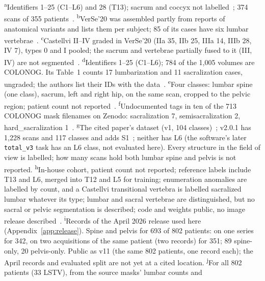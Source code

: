 \begin{table}[h]
\smallskip
\footnotesize
\raggedright
\textsuperscript{a}Identifiers 1--25 (C1--L6) and 28 (T13); sacrum and coccyx not
labelled~\citep{VerSeRepo}; 374 scans of 355 patients~\citep{Sekuboyina2021VerSe:Images}.
\textsuperscript{b}VerSe'20 was assembled partly from reports of anatomical variants and
lists them per subject; 85 of its cases have six lumbar vertebrae~\citep{Liebl2021VerSeData}.
\textsuperscript{c}Castellvi II--IV graded in VerSe'20 (IIa 35, IIb 25, IIIa 14, IIIb 28,
IV 7), types 0 and I pooled; the sacrum and vertebrae partially fused to it (III, IV) are
not segmented~\citep{Liebl2021VerSeData}.
\textsuperscript{d}Identifiers 1--25 (C1--L6); 784 of the 1{,}005 volumes are COLONOG.
Its Table~1 counts 17 lumbarization and 11 sacralization cases, ungraded; the authors list
their IDs with the data~\citep{Deng2021CTSpine1K:Tomography}.
\textsuperscript{e}Four classes: lumbar spine (one class), sacrum, left and right hip, on
the same scan, cropped to the pelvic region; patient count not
reported~\citep{Liu2021DeepModels}.
\textsuperscript{f}Undocumented tags in ten of the 713 COLONOG mask filenames on Zenodo:
sacralization 7, semisacralization 2, hard\_sacralization 1~\citep{Liu2020CTPelvic1KData,Schwing2026CTSpinoPelvic1KArxiv}.
\textsuperscript{g}The cited paper's dataset (v1, 104 classes)~\citep{Wasserthal2023TotalSegmentator:Images,Wasserthal2022TSDatasetV1};
v2.0.1 has 1{,}228 scans and 117 classes and adds
S1~\citep{Wasserthal2023TSDatasetV2,TotalSegmentatorCode}; neither has L6 (the software's
later \texttt{total\_v3} task has an L6 class, not evaluated here). Every
structure in the field of view is labelled; how many scans hold both lumbar spine and
pelvis is not reported.
\textsuperscript{h}In-house cohort, patient count not reported; reference labels include
T13 and L6, merged into T12 and L5 for training; enumeration anomalies are labelled by
count, and a Castellvi transitional vertebra is labelled sacralized lumbar whatever its type;
lumbar and sacral vertebrae are distinguished, but no sacral or pelvic segmentation is
described; code and weights public, no image release
described~\citep{Moller2026VERIDAH:Sequences}.
\textsuperscript{i}Records of the April 2026 release used here (Appendix~\ref{app:release}).
Spine and pelvis for 693 of 802 patients: on one series for 342, on two acquisitions of the
same patient (two records) for 351; 89 spine-only, 20 pelvis-only. Public as v11 (the same
802 patients, one record each); the April records and evaluated split are not yet at a
cited location.
\textsuperscript{j}For all 802 patients (33 LSTV), from the source masks' lumbar counts and

\end{table}
